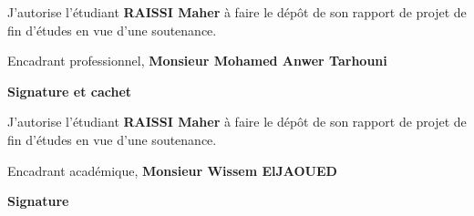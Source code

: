 \thispagestyle{empty}

\begin{center}
    \begin{minipage}[l]{1\columnwidth}
        \begin{tcolorbox}[colback=white,boxrule=5pt,arc=10pt,height=105mm]{
            \vspace{2cm}
            \large J'autorise l'\'etudiant \textbf{RAISSI Maher} \`a faire le d\'ep\^ot de son rapport de projet de fin d'\'etudes en vue d'une soutenance.
            \vspace{1mm}
            \begin{center}
                \Large
                Encadrant professionnel, \textbf{Monsieur Mohamed Anwer Tarhouni}
            \end{center}
            \vspace{5mm}
            \hspace{0.55\columnwidth}\textbf{\large Signature et cachet}
        }
        \end{tcolorbox}
    \end{minipage}
    
    \vspace{2cm}
    
    \begin{minipage}[l]{1\columnwidth}
        \begin{tcolorbox}[colback=white,boxrule=5pt,arc=10pt,height=105mm]{
            \vspace{2cm}
            \large J'autorise l'\'etudiant \textbf{RAISSI Maher} \`a faire le d\'ep\^ot de son rapport de projet de fin d'\'etudes en vue d'une soutenance.
            \vspace{1mm}
            \begin{center}
                \Large
                Encadrant acad\'emique, \textbf{Monsieur Wissem ElJAOUED}
            \end{center}
            \vspace{5mm}
            \hspace{0.70\columnwidth}\textbf{\large Signature}
        }
        \end{tcolorbox}
    \end{minipage}
\end{center}
